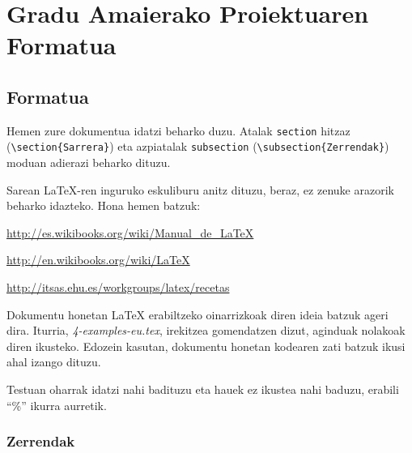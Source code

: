 \chapter{Gradu Amaierako Proiektuaren Formatua}
\label{ch:aurkezpena}




\section{Formatua}
\label{atala:formatua}


Hemen zure dokumentua idatzi beharko duzu. Atalak \texttt{section} hitzaz \\
(\verb+\section{Sarrera}+) eta azpiatalak \texttt{subsection} (\verb+\subsection{Zerrendak}+) moduan adierazi beharko dituzu.

Sarean \LaTeX{}-ren inguruko eskuliburu anitz dituzu, beraz, ez zenuke arazorik beharko idazteko. Hona hemen batzuk:

\vspace{0.25cm}

\url{http://es.wikibooks.org/wiki/Manual\_de\_LaTeX}

\url{http://en.wikibooks.org/wiki/LaTeX}

\url{http://itsas.ehu.es/workgroups/latex/recetas}

\vspace{0.15 cm}

Dokumentu honetan \LaTeX{} erabiltzeko oinarrizkoak diren ideia batzuk ageri dira. Iturria, \emph{4-examples-eu.tex}, irekitzea gomendatzen dizut, aginduak nolakoak diren ikusteko. Edozein kasutan, dokumentu honetan kodearen zati batzuk ikusi ahal izango dituzu.

Testuan oharrak idatzi nahi badituzu eta hauek ez ikustea nahi baduzu, erabili ``\%'' ikurra aurretik.



\subsection{Zerrendak}
\label{azpiatala:zerrendak}

